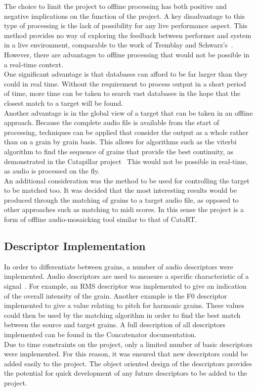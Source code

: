 \documentclass{scrartcl}
\begin{document}
    The choice to limit the project to offline processing has both positive and
    negative implications on the function of the project. A key disadvantage to
    this type of processing is the lack of possibility for any live performance
    aspect. This method provides no way of exploring the feedback between
    performer and system in a live environment, comparable to the work of
    Tremblay and Schwarz's~\citeyearpar{Tremblay2010}.
    However, there are advantages to offline processing that would not be
    possible in a real-time context.\\
    One significant advantage is that databases can afford to be far larger
    than they could in real time. Without the requirement to process output in
    a short period of time, more time can be taken to search vast databases in
    the hope that the closest match to a target will be found.\\
    Another advantage is in the global view of a target that can be taken in an
    offline approach. Because the complete audio file is available from the
    start of processing, techniques can be applied that consider the output as
    a whole rather than on a grain by grain basis. This allows for algorithms
    such as the viterbi algorithm to find the sequence of grains that provide
    the best continuity, as demonstrated in the Catapillar
    project~\parencite[p.4]{Schwarz2003} This would not be possible in
    real-time, as audio is processed on the fly.\\

    An additional consideration was the method to be used for controlling the
    target to be matched too. It was decided that the most interesting results
    would be produced through the matching of grains to a target audio file, as
    opposed to other approaches such as matching to midi scores. In this sense
    the project is a form of offline audio-mosaicking tool similar to that of
    CataRT.
    
    \subsection*{Descriptor Implementation}
    In order to differentiate between grains, a number of audio descriptors
    were implemented. Audio descriptors are used to measure a specific
    characteristic of a signal~\parencite[p.31]{Lerch2012}. For example, an RMS
    descriptor was implemented to give an indication of the overall intensity
    of the grain. Another example is the F0 descriptor implemented to give a
    value relating to pitch for harmonic grains. These values could then be
    used by the matching algorithm in order to find the best match between the
    source and target grains. A full description of all descriptors implemented
    can be found in the Concatenator documentation.\\
    Due to time constraints on the project, only a limited number of basic
    descriptors were implemented. For this reason, it was ensured that new
    descriptors could be added easily to the project. The object oriented
    design of the descriptors provides the potential for quick development of
    any future descriptors to be added to the project. 
\end{document}

